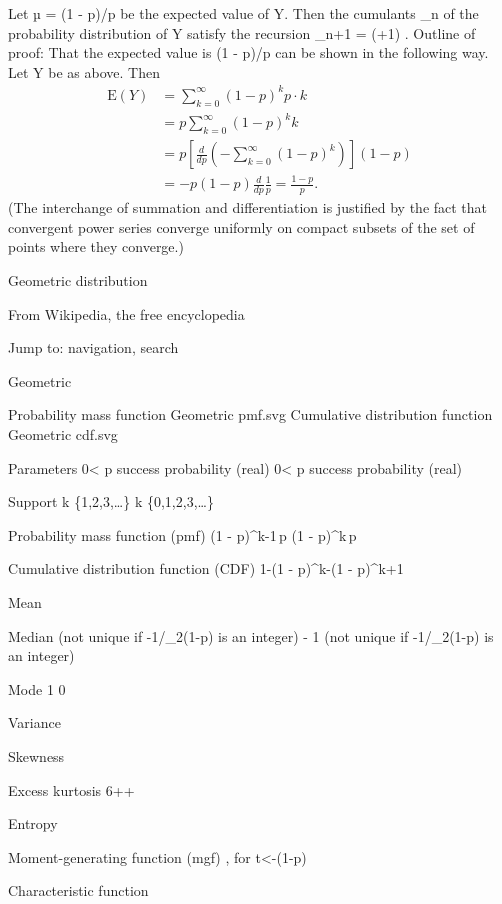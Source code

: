 Let µ = (1 - p)/p be the expected value of Y. Then the cumulants \kappa_n of the probability distribution of Y satisfy the recursion
\kappa_{n+1} = \mu(\mu+1) .
Outline of proof: That the expected value is (1 - p)/p can be shown in the following way. Let Y be as above. Then
\begin{align} \mathrm{E}(Y) & {} =\sum_{k=0}^\infty (1-p)^k p\cdot k \\ & {} =p\sum_{k=0}^\infty(1-p)^k k \\ & {} = p\left[\frac{d}{dp}\left(-\sum_{k=0}^\infty (1-p)^k\right)\right](1-p) \\ & {} =-p(1-p)\frac{d}{dp}\frac{1}{p}=\frac{1-p}{p}. \end{align} 
(The interchange of summation and differentiation is justified by the fact that convergent power series converge uniformly on compact subsets of the set of points where they converge.)

\newpage


Geometric distribution

From Wikipedia, the free encyclopedia 

Jump to: navigation, search 


Geometric

Probability mass function
Geometric pmf.svg 
Cumulative distribution function
Geometric cdf.svg 

Parameters
0< p  success probability (real) 0< p  success probability (real) 

Support
k \in \{1,2,3,\dots\}\! k \in \{0,1,2,3,\dots\}\! 

Probability mass function (pmf)
(1 - p)^{k-1}\,p\! (1 - p)^{k}\,p\! 

Cumulative distribution function (CDF)
1-(1 - p)^k-(1 - p)^{k+1}\! 

Mean
\! \! 

Median
\left\lceil {} \right\rceil\! (not unique if -1/\log_2(1-p) is an integer) \left\lceil {} \right\rceil\! - 1 (not unique if -1/\log_2(1-p) is an integer) 

Mode
1 0 

Variance
\! \! 

Skewness
\! \! 

Excess kurtosis
6++\! 

Entropy
\! \! 

Moment-generating function (mgf)
\!,
for t<-\ln(1-p)\! \! 

Characteristic function
\! \! 